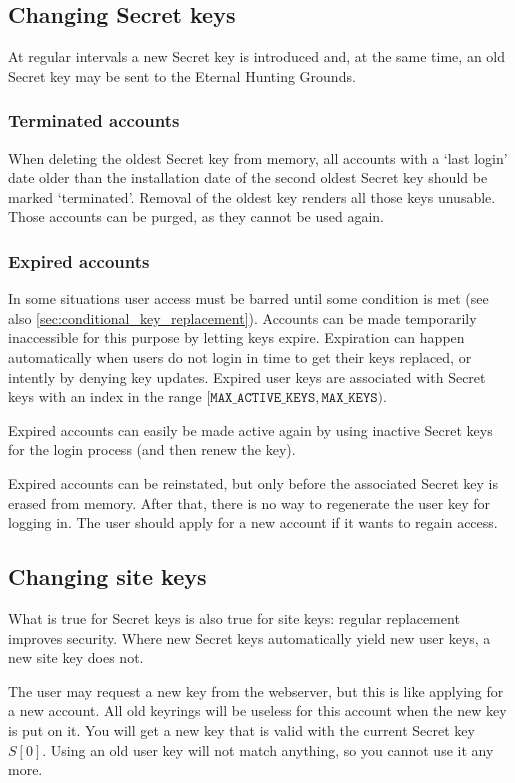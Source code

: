 \subsection{Changing Secret keys}
At regular intervals a new Secret key is introduced and,
at the same time,
an old Secret key may be sent to the Eternal Hunting Grounds.

\subsubsection{Terminated accounts}
When deleting the oldest Secret key from memory,
all accounts with a `last login' date older than the installation
date of the second oldest Secret key should be marked `terminated'.
Removal of the oldest key renders all those keys unusable.
Those accounts can be purged, as they cannot be used again.

\subsubsection{Expired accounts}
In some situations user access must be barred until some condition is met
(see also \vref{sec:conditional_key_replacement}).
Accounts can be made temporarily inaccessible for this purpose by letting keys expire.
Expiration can happen automatically when users do not login in time to get their keys replaced,
or intently by denying key updates.
Expired user keys are associated with Secret keys with an index in the range $[\texttt{MAX\_ACTIVE\_KEYS},\texttt{MAX\_KEYS})$.
\par
Expired accounts can easily be made active again by using inactive Secret keys for the login process (and then renew the key).
\par
Expired accounts can be reinstated,
but only before the associated Secret key is erased from memory.
After that, there is no way to regenerate the user key for logging in.
The user should apply for a new account if it wants to regain access.

\subsection{Changing site keys}
What is true for Secret keys is also true for site keys:
regular replacement improves security.
Where new Secret keys automatically yield new user keys, a new site key does not.
\par
The user may request a new key from the webserver,
but this is like applying for a new account.
All old keyrings will be useless for this account when the new key is put on it.
You will get a new key that is valid with the current Secret key $S[0]$.
Using an old user key will not match anything,
so you cannot use it any more.


